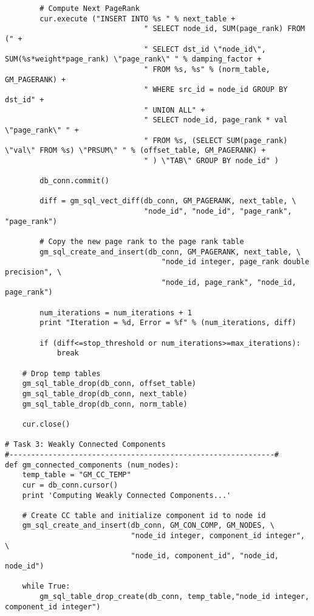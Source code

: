 \documentclass[11pt]{article}
\begin{document}
\begin{lstlisting}
        # Compute Next PageRank
        cur.execute ("INSERT INTO %s " % next_table + 
                                " SELECT node_id, SUM(page_rank) FROM (" +
                                " SELECT dst_id \"node_id\", SUM(%s*weight*page_rank) \"page_rank\" " % damping_factor +
                                " FROM %s, %s" % (norm_table, GM_PAGERANK) +
                                " WHERE src_id = node_id GROUP BY dst_id" +
                                " UNION ALL" + 
                                " SELECT node_id, page_rank * val \"page_rank\" " +
                                " FROM %s, (SELECT SUM(page_rank) \"val\" FROM %s) \"PRSUM\" " % (offset_table, GM_PAGERANK) + 
                                " ) \"TAB\" GROUP BY node_id" )
        
        db_conn.commit()
        
        diff = gm_sql_vect_diff(db_conn, GM_PAGERANK, next_table, \
                                "node_id", "node_id", "page_rank", "page_rank")
                
        # Copy the new page rank to the page rank table
        gm_sql_create_and_insert(db_conn, GM_PAGERANK, next_table, \
                                    "node_id integer, page_rank double precision", \
                                    "node_id, page_rank", "node_id, page_rank")

        num_iterations = num_iterations + 1
        print "Iteration = %d, Error = %f" % (num_iterations, diff)        
        
        if (diff<=stop_threshold or num_iterations>=max_iterations):
            break
        
    # Drop temp tables
    gm_sql_table_drop(db_conn, offset_table)
    gm_sql_table_drop(db_conn, next_table)
    gm_sql_table_drop(db_conn, norm_table)
    
    cur.close()
    
# Task 3: Weakly Connected Components
#-------------------------------------------------------------#
def gm_connected_components (num_nodes):
    temp_table = "GM_CC_TEMP"
    cur = db_conn.cursor()
    print 'Computing Weakly Connected Components...'

    # Create CC table and initialize component id to node id
    gm_sql_create_and_insert(db_conn, GM_CON_COMP, GM_NODES, \
                             "node_id integer, component_id integer", \
                             "node_id, component_id", "node_id, node_id")
    
    while True:
        gm_sql_table_drop_create(db_conn, temp_table,"node_id integer, component_id integer")
        

\end{lstlisting}
\end{document}
